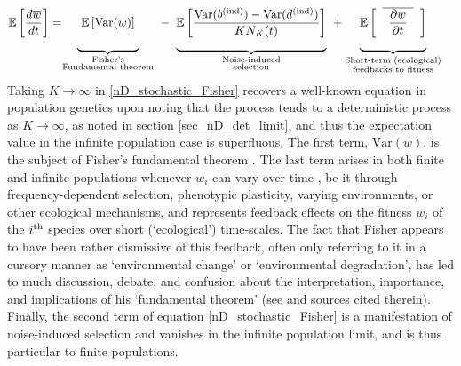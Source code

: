 \begin{align}
\label{nD_stochastic_Fisher}
\mathbb{E}\left[\frac{d\overline{w}}{dt}\right] &= 
\negmedspace {\underbrace{\mystrut{4ex} \ \vphantom{ \frac{\textrm{Var}(b^{\textrm{(ind)}}) - \textrm{Var}(d^{\textrm{(ind)}})}{KN_K(t)} } \mathbb{E}\left[\textrm{Var}(w)\right] \ }_{\substack{\text{Fisher's} \\ \text{Fundamental theorem}}}} \ - \ {\underbrace{\mystrut{4ex}\mathbb{E}\left[\frac{\textrm{Var}(b^{\textrm{(ind)}}) - \textrm{Var}(d^{\textrm{(ind)}})}{KN_K(t)}\right]}_{\substack{\text{Noise-induced} \\ \text{selection}}}} \ + {\underbrace{\mystrut{4ex} \vphantom{ \frac{\textrm{Var}(b^{\textrm{(ind)}}) - \textrm{Var}(d^{\textrm{(ind)}})}{KN_K(t)} } \mathbb{E}\left[\hphantom{a}\overline{\hphantom{a}\frac{\partial w}{\partial t}\hphantom{a}}\hphantom{a}\right]}_{\substack{\text{Short-term (ecological)} \\ \text{feedbacks to fitness}}}}
\end{align}
Taking $K \to \infty$ in \eqref{nD_stochastic_Fisher} recovers a well-known equation in population genetics upon noting that the process tends to a deterministic process as $K \to \infty$, as noted in section \ref{sec_nD_det_limit}, and thus the expectation value in the infinite population case is superfluous. The first term, $\textrm{Var}(w)$, is the subject of Fisher's fundamental theorem \citep{price_fishers_1972, frank_fishers_1992, kokko_stagnation_2021}. The last term arises in both finite and infinite populations whenever $w_i$ can vary over time \citep{baez_fundamental_2021}, be it through frequency-dependent selection, phenotypic plasticity, varying environments, or other ecological mechanisms, and represents feedback effects on the fitness $w_i$ of the $i\textsuperscript{th}$ species over short (`ecological') time-scales. The fact that Fisher appears to have been rather dismissive of this feedback, often only referring to it in a cursory manner as `environmental change' or `environmental degradation', has led to much discussion, debate, and confusion about the interpretation, importance, and implications of his `fundamental theorem' (see \cite{kokko_stagnation_2021} and sources cited therein). Finally, the second term of equation \eqref{nD_stochastic_Fisher} is a manifestation of noise-induced selection and vanishes in the infinite population limit, and is thus particular to finite populations.\\
